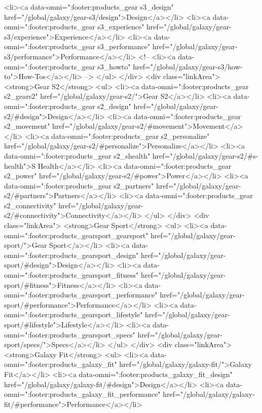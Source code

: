 {{{{{{{{{{{{{{{{{{{{{{{{{{{{{{{{{{{{{{{{{{{{{{{{{{{{{				<li><a data-omni=":footer:products_gear s3_design" href="/global/galaxy/gear-s3/design">Design</a></li>
				<li><a data-omni=":footer:products_gear s3_experience" href="/global/galaxy/gear-s3/experience">Experience</a></li>
				<li><a data-omni=":footer:products_gear s3_performance" href="/global/galaxy/gear-s3/performance">Performance</a></li>
				<!-- <li><a data-omni=":footer:products_gear s3_howto" href="/global/galaxy/gear-s3/how-to">How-Tos</a></li> -->
			</ul>
		</div>
		<div class="linkArea">
			<strong>Gear S2</strong>
			<ul>
				<li><a data-omni=":footer:products_gear s2_gears2" href="/global/galaxy/gear-s2/">Gear S2</a></li>
				<li><a data-omni=":footer:products_gear s2_design" href="/global/galaxy/gear-s2/#design">Design</a></li>
				<li><a data-omni=":footer:products_gear s2_movement" href="/global/galaxy/gear-s2/#movement">Movement</a></li>
				<li><a data-omni=":footer:products_gear s2_personalize" href="/global/galaxy/gear-s2/#personalize">Personalize</a></li>
				<li><a data-omni=":footer:products_gear s2_shealth" href="/global/galaxy/gear-s2/#s-health">S Health</a></li>
				<li><a data-omni=":footer:products_gear s2_power" href="/global/galaxy/gear-s2/#power">Power</a></li>
				<li><a data-omni=":footer:products_gear s2_partners" href="/global/galaxy/gear-s2/#partners">Partners</a></li>
				<li><a data-omni=":footer:products_gear s2_connectivity" href="/global/galaxy/gear-s2/#connectivity">Connectivity</a></li>
			</ul>
		</div>
		<div class="linkArea">
			<strong>Gear Sport</strong>
			<ul>
				<li><a data-omni=":footer:products_gearsport_gearsport" href="/global/galaxy/gear-sport/">Gear Sport</a></li>
				<li><a data-omni=":footer:products_gearsport_design" href="/global/galaxy/gear-sport/#design">Design</a></li>
				<li><a data-omni=":footer:products_gearsport_fitness" href="/global/galaxy/gear-sport/#fitness">Fitness</a></li>
				<li><a data-omni=":footer:products_gearsport_performance" href="/global/galaxy/gear-sport/#performance">Performance</a></li>
				<li><a data-omni=":footer:products_gearsport_lifestyle" href="/global/galaxy/gear-sport/#lifestyle">Lifestyle</a></li>
				<li><a data-omni=":footer:products_gearsport_specs" href="/global/galaxy/gear-sport/specs/">Specs</a></li>
			</ul>
		</div>
		<div class="linkArea">
			<strong>Galaxy Fit</strong>
			<ul>
				<li><a data-omni=":footer:products_galaxy_fit" href="/global/galaxy/galaxy-fit/">Galaxy Fit</a></li>
				<li><a data-omni=":footer:products_galaxy_fit_design" href="/global/galaxy/galaxy-fit/#design">Design</a></li>
				<li><a data-omni=":footer:products_galaxy_fit_performance" href="/global/galaxy/galaxy-fit/#performance">Performance</a></li>
}}}}}}}}}}}}}}}}}}}}}}}}}}}}}}}}}}}}}}}}}}}}}}}}}}}}}
